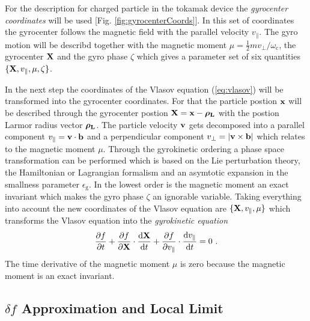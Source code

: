 For the description for charged particle in the tokamak device the \textit{gyrocenter coordinates} will be used [Fig. \ref{fig:gyrocenterCoords}]. In this set of coordinates the gyrocenter follows the magnetic field with the parallel velocity $v_{\parallel}$. The gyro motion will be describd together with the magnetic moment $\mu = \frac{1}{2}mv_\perp/\omega_\mathrm{c}$, the gyrocenter $\boldsymbol{\mathbf{X}}$ and the gyro phase $\zeta$ which gives a parameter set of six quantities $\{\boldsymbol{\mathbf{X}}, v_{\parallel}, \mu, \zeta\}$.


In the next step the coordinates of the Vlasov equation (\ref{eq:vlasov}) will be transformed into the gyrocenter coordinates. For that the particle postion $\boldsymbol{\mathbf{x}}$ will be described through the gyrocenter postion $\boldsymbol{\mathbf{X}} = \boldsymbol{\mathbf{x}} - \boldsymbol{\mathbf{\rho_\mathrm{L}}}$ with the postion Larmor radius vector $\boldsymbol{\mathbf{\rho_\mathrm{L}}}$. The particle velocity $\boldsymbol{\mathbf{v}}$ gets decomposed into a parallel component $v_\parallel = \boldsymbol{\mathbf{v}} \cdot \boldsymbol{\mathbf{b}}$ and 
a perpendicular component $v_\perp = |\boldsymbol{\mathbf{v}} \times \boldsymbol{\mathbf{b}}|$ which relates to the magnetic moment $\mu$. Through the gyrokinetic ordering a phase space transformation can be performed which is based on the Lie perturbation theory, the Hamiltonian or Lagrangian formalism and an asymtotic expansion in the smallness parameter $\epsilon_\mathrm{g}$. In the lowest order is the magnetic moment an exact invariant which makes the gyro phase $\zeta$ an ignorable variable. \cite{Garbet2010,Cary1981,Cary1983} Taking everything into account the new coordinates of the Vlasov equation are $\{\boldsymbol{\mathbf{X}}, v_{\parallel}, \mu\}$ which transforms the Vlasov equation into the \textit{gyrokinetic equation}
\begin{gather}
	\frac{\partial f}{\partial t} + \frac{\partial f}{\partial \boldsymbol{\mathbf{X}}} \cdot \frac{\mathrm{d}\boldsymbol{\mathbf{X}}}{\mathrm{d}t} + \frac{\partial f}{\partial v_\parallel} \cdot \frac{\mathrm{d}v_\parallel}{\mathrm{d}t} = 0~.
	\label{eq:gyrokinetic}
\end{gather}
The time derivative of the magnetic moment $\mu$ is zero because the magnetic moment is an exact invariant. 

\subsection{$\delta f$ Approximation and Local Limit}
\label{sub:application}

